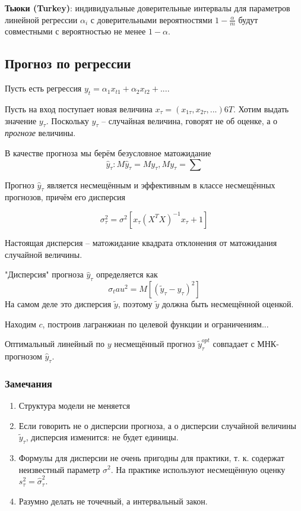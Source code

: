 \documentclass[main.tex]{subfiles}
\begin{document}
\begin{theorem}
\textbf{Тьюки (Turkey)}: индивидуальные доверительные интервалы для параметров линейной регрессии $ \alpha_i $ с доверительными вероятностями $ 1 - \frac{\alpha}{m} $ будут совместными с вероятностью не менее $ 1 - \alpha $.

\end{theorem}


\subsection{Прогноз по регрессии}

Пусть есть регрессия $ y_t = \alpha_1 x_{t1} + \alpha_2 x_{t2} + ... $.

Пусть на вход поступает новая величина $ x_\tau = (x_{1\tau}, x_{2\tau}, ...)6T $.
Хотим выдать значение $ y_\tau $.
Поскольку $ y_\tau $ -- случайная величина, говорят не об оценке, а о \emph{прогнозе} величины.

В качестве прогноза мы берём безусловное матожидание
$$ \hat y_\tau: M \hat y_\tau = M y_\tau, My_\tau = \sum $$

\begin{theorem}
    Прогноз $ \hat y_\tau $ является несмещённым и эффективным в классе несмещённых прогнозов, причём его дисперсия

    $$ \sigma_\tau^2 = \sigma^2[x_\tau(X^TX)^{-1}x_\tau + 1] $$
\end{theorem}

Настоящая дисперсия -- матожидание квадрата отклонения от матожидания случайной величины.

"Дисперсия" прогноза $ \hat y_\tau $ определяется как
$$ \sigma_tau^2 = M[(\tilde y_\tau - y_\tau)^2] $$
На самом деле это дисперсия $ \tilde y $, поэтому $ \tilde y $ должна быть несмещённой оценкой.

Находим $ c $, построив лагранжиан по целевой функции и ограничениям...

Оптимальный линейный по $ y $ несмещённый прогноз $ \tilde y_\tau^{opt} $ совпадает с МНК-прогнозом $ \hat y_\tau $.

\subsubsection{Замечания}

\begin{enumerate}[noitemsep]
    \item Структура модели не меняется
    \item Если говорить не о дисперсии прогноза, а о дисперсии случайной величины $ \tilde y_\tau $, дисперсия изменится: не будет единицы.
    \item Формулы для дисперсии не очень пригодны для практики, т. к. содержат неизвестный параметр $ \sigma^2 $.
    На практике используют несмещённую оценку $ s_\tau^2 = \hat \sigma_\tau^2 $.
    \item Разумно делать не точечный, а интервальный закон.
\end{enumerate}
\end{document}
